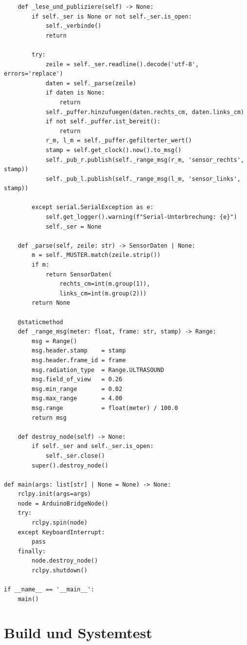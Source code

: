 \begin{lstlisting}
    def _lese_und_publiziere(self) -> None:
        if self._ser is None or not self._ser.is_open:
            self._verbinde()
            return

        try:
            zeile = self._ser.readline().decode('utf-8', errors='replace')
            daten = self._parse(zeile)
            if daten is None:
                return
            self._puffer.hinzufuegen(daten.rechts_cm, daten.links_cm)
            if not self._puffer.ist_bereit():
                return
            r_m, l_m = self._puffer.gefilterter_wert()
            stamp = self.get_clock().now().to_msg()
            self._pub_r.publish(self._range_msg(r_m, 'sensor_rechts', stamp))
            self._pub_l.publish(self._range_msg(l_m, 'sensor_links',  stamp))

        except serial.SerialException as e:
            self.get_logger().warning(f"Serial-Unterbrechung: {e}")
            self._ser = None

    def _parse(self, zeile: str) -> SensorDaten | None:
        m = self._MUSTER.match(zeile.strip())
        if m:
            return SensorDaten(
                rechts_cm=int(m.group(1)),
                links_cm=int(m.group(2)))
        return None

    @staticmethod
    def _range_msg(meter: float, frame: str, stamp) -> Range:
        msg = Range()
        msg.header.stamp    = stamp
        msg.header.frame_id = frame
        msg.radiation_type  = Range.ULTRASOUND
        msg.field_of_view   = 0.26
        msg.min_range       = 0.02
        msg.max_range       = 4.00
        msg.range           = float(meter) / 100.0
        return msg

    def destroy_node(self) -> None:
        if self._ser and self._ser.is_open:
            self._ser.close()
        super().destroy_node()

def main(args: list[str] | None = None) -> None:
    rclpy.init(args=args)
    node = ArduinoBridgeNode()
    try:
        rclpy.spin(node)
    except KeyboardInterrupt:
        pass
    finally:
        node.destroy_node()
        rclpy.shutdown()

if __name__ == '__main__':
    main()
\end{lstlisting}

\section{Build und Systemtest}

